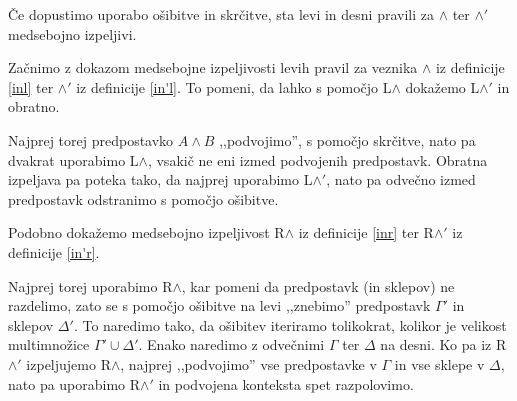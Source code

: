 \begin{lema}
    Če dopustimo uporabo ošibitve in skrčitve, sta levi in desni pravili za $\land$ ter $\land'$ medsebojno izpeljivi.
\end{lema}
\begin{dokaz}
    Začnimo z dokazom medsebojne izpeljivosti levih pravil za veznika $\land$ iz definicije \ref{inl} ter $\land'$ iz definicije \ref{in'l}. To pomeni, da lahko s pomočjo L$\land$ dokažemo L$\land'$ in obratno.
    \begin{prooftree}
    \end{prooftree}
    Najprej torej predpostavko $A \land B$ ,,podvojimo'', s pomočjo skrčitve, nato pa dvakrat uporabimo L$\land$, vsakič ne eni izmed podvojenih predpostavk. Obratna izpeljava pa poteka tako, da najprej uporabimo L$\land'$, nato pa odvečno izmed predpostavk odstranimo s pomočjo ošibitve.
    \begin{prooftree}
    \end{prooftree}
    Podobno dokažemo medsebojno izpeljivost R$\land$ iz definicije \ref{inr} ter R$\land'$ iz definicije \ref{in'r}.
    \begin{prooftree}


    \end{prooftree}
    Najprej torej uporabimo R$\land$, kar pomeni da predpostavk (in sklepov) ne razdelimo, zato se s pomočjo ošibitve na levi ,,znebimo'' predpostavk $\Gamma'$ in sklepov $\Delta'$. To naredimo tako, da ošibitev iteriramo tolikokrat, kolikor je velikost multimnožice $\Gamma'\cup\Delta'$. Enako naredimo z odvečnimi $\Gamma$ ter $\Delta$ na desni. Ko pa iz R$\land'$ izpeljujemo R$\land$, najprej ,,podvojimo'' vse predpostavke v $\Gamma$ in vse sklepe v $\Delta$, nato pa uporabimo R$\land'$ in podvojena konteksta spet razpolovimo.
    \begin{prooftree}
    \end{prooftree}
    \vskip -15pt \qedhere
\end{dokaz}
